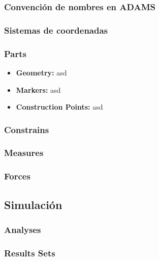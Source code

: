         
        \subsubsection{Convención de nombres en ADAMS}
        
        \subsubsection{Sistemas de coordenadas}
        
        \subsubsection{Parts}
        
        \begin{itemize}
            \item \textbf{Geometry:} asd
            \item \textbf{Markers:} asd
            \item \textbf{Construction Points:} asd
        \end{itemize}

        
        \subsubsection{Constrains}
        
        \subsubsection{Measures}
        
        \subsubsection{Forces}
        
    
    \subsection{Simulación}
    
        \subsubsection{Analyses}
        
        \subsubsection{Results Sets}
        
